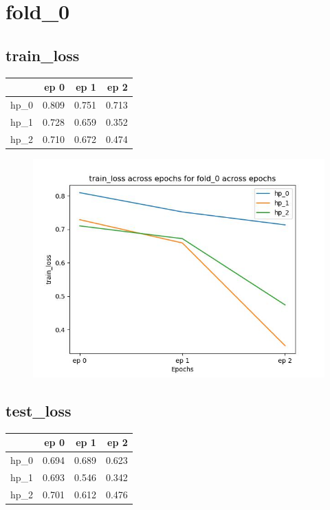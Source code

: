 \documentclass{article}
\begin{document}
\section{fold\_0}
\subsection{train\_loss}
\begin{tabular}{lrrr}
\toprule
{} &   ep 0 &   ep 1 &   ep 2 \\
\midrule
hp\_0 &  0.809 &  0.751 &  0.713 \\
hp\_1 &  0.728 &  0.659 &  0.352 \\
hp\_2 &  0.710 &  0.672 &  0.474 \\
\bottomrule
\end{tabular}

\begin{figure}[H]
\includegraphics[scale = 0.75]{fold_0/train_loss}
\end{figure}
\subsection{test\_loss}
\begin{tabular}{lrrr}
\toprule
{} &   ep 0 &   ep 1 &   ep 2 \\
\midrule
hp\_0 &  0.694 &  0.689 &  0.623 \\
hp\_1 &  0.693 &  0.546 &  0.342 \\
hp\_2 &  0.701 &  0.612 &  0.476 \\
\bottomrule
\end{tabular}
\end{document}
